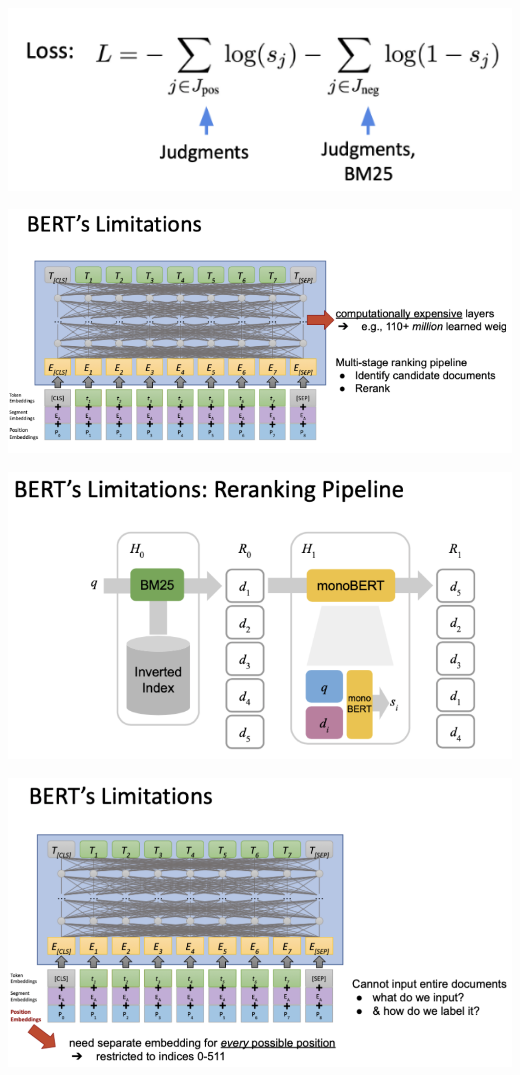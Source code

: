 \begin{minipage}{0.5\textwidth}
\includegraphics[scale=0.5]{figures/bert3.png}
\end{minipage}
\begin{minipage}{0.5\textwidth}
\includegraphics[scale=0.5]{figures/bert4.png}
\end{minipage}

\begin{minipage}{0.5\textwidth}
\includegraphics[scale=0.5]{figures/bert5.png}
\end{minipage}
\begin{minipage}{0.5\textwidth}
\includegraphics[scale=0.5]{figures/bert6.png}
\end{minipage}

